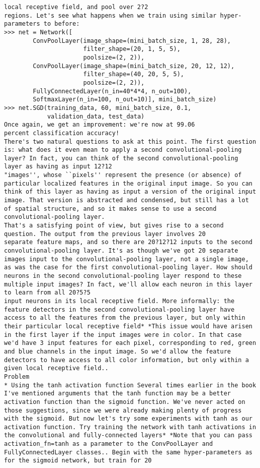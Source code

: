 \begin{lstlisting}
local receptive field, and pool over 2?2
regions. Let's see what happens when we train using similar hyper-parameters to before:
>>> net = Network([
        ConvPoolLayer(image_shape=(mini_batch_size, 1, 28, 28), 
                      filter_shape=(20, 1, 5, 5), 
                      poolsize=(2, 2)),
        ConvPoolLayer(image_shape=(mini_batch_size, 20, 12, 12), 
                      filter_shape=(40, 20, 5, 5), 
                      poolsize=(2, 2)),
        FullyConnectedLayer(n_in=40*4*4, n_out=100),
        SoftmaxLayer(n_in=100, n_out=10)], mini_batch_size)
>>> net.SGD(training_data, 60, mini_batch_size, 0.1, 
            validation_data, test_data)        
Once again, we get an improvement: we're now at 99.06
percent classification accuracy!
There's two natural questions to ask at this point. The first question is: what does it even mean to apply a second convolutional-pooling layer? In fact, you can think of the second convolutional-pooling layer as having as input 12?12
"images'', whose ``pixels'' represent the presence (or absence) of particular localized features in the original input image. So you can think of this layer as having as input a version of the original input image. That version is abstracted and condensed, but still has a lot of spatial structure, and so it makes sense to use a second convolutional-pooling layer.
That's a satisfying point of view, but gives rise to a second question. The output from the previous layer involves 20
separate feature maps, and so there are 20?12?12 inputs to the second convolutional-pooling layer. It's as though we've got 20 separate images input to the convolutional-pooling layer, not a single image, as was the case for the first convolutional-pooling layer. How should neurons in the second convolutional-pooling layer respond to these multiple input images? In fact, we'll allow each neuron in this layer to learn from all 20?5?5
input neurons in its local receptive field. More informally: the feature detectors in the second convolutional-pooling layer have access to all the features from the previous layer, but only within their particular local receptive field* *This issue would have arisen in the first layer if the input images were in color. In that case we'd have 3 input features for each pixel, corresponding to red, green and blue channels in the input image. So we'd allow the feature detectors to have access to all color information, but only within a given local receptive field..
Problem
* Using the tanh activation function Several times earlier in the book I've mentioned arguments that the tanh function may be a better activation function than the sigmoid function. We've never acted on those suggestions, since we were already making plenty of progress with the sigmoid. But now let's try some experiments with tanh as our activation function. Try training the network with tanh activations in the convolutional and fully-connected layers* *Note that you can pass activation_fn=tanh as a parameter to the ConvPoolLayer and FullyConnectedLayer classes.. Begin with the same hyper-parameters as for the sigmoid network, but train for 20

\end{lstlisting}

